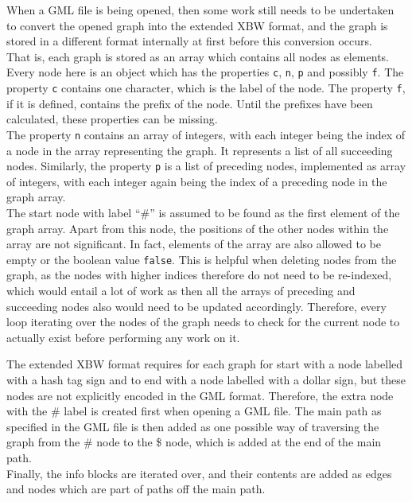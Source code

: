 \documentclass[a4paper,12pt,twoside,BCOR=10mm]{scrbook}
\begin{document}
When a GML file is being opened, then some work still needs to be undertaken
to convert the opened graph into the extended XBW format, and the graph is stored
in a different format internally at first before this conversion occurs. \\
That is, each graph is stored as an array which contains all nodes as elements.
Every node here is an object which has the properties \texttt{c}, \texttt{n}, \texttt{p} and
possibly \texttt{f}. The property \texttt{c} contains one character, which is the label of the node.
The property \texttt{f}, if it is defined, contains the prefix of the node. Until the prefixes have
been calculated, these properties can be missing. \\
The property \texttt{n} contains an array of integers, with each integer being the index
of a node in the array representing the graph. It represents a list of all succeeding nodes.
Similarly, the property \texttt{p} is a list of preceding nodes, implemented as array of integers,
with each integer again being the index of a preceding node in the graph array. \\
The start node with label “$\#$” is assumed to be found as the first element
of the graph array. Apart from this node, the positions of the other nodes within
the array are not significant. In fact, elements of the array are also allowed to
be empty or the boolean value \texttt{false}. This is helpful when deleting
nodes from the graph, as the nodes with higher indices therefore do not need to be re-indexed,
which would entail a lot of work as then all the arrays of preceding and succeeding nodes
also would need to be updated accordingly.
Therefore, every loop iterating over the nodes of the graph needs to check for the
current node to actually exist before performing any work on it.

The extended XBW format requires for each graph for start with a node labelled with a
hash tag sign and to end with a node labelled with a dollar sign,
but these nodes are not explicitly encoded in the GML format.
Therefore, the extra node with the $\#$ label is created first when opening a GML file.
The main path as specified in the GML file is then added as one possible way
of traversing the graph from the $\#$ node to the \$ node, which is added at the end of the main path. \\
Finally, the info blocks are iterated over, and their contents are added as edges and nodes which are part
of paths off the main path.
\end{document}
